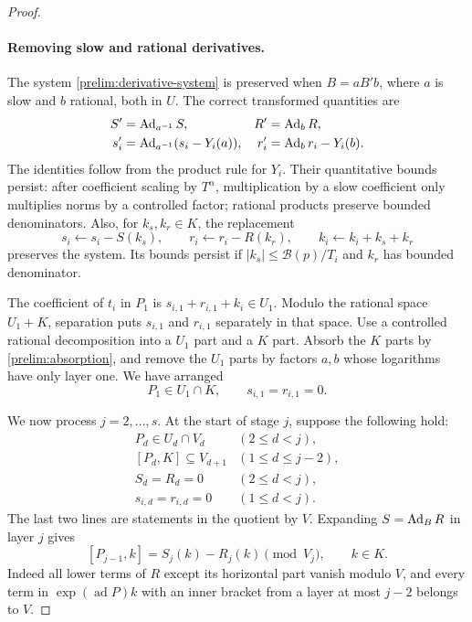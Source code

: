 \begin{proof}
\paragraph{Removing slow and rational derivatives.}
The system \eqref{prelim:derivative-system} is preserved when
$B=aB'b$, where $a$ is slow and $b$ rational, both in $U$.
The correct transformed quantities are
\begin{equation}\label{prelim:transformation}
 \begin{aligned}
 S'&=\operatorname{Ad}_{a^{-1}}S,& R'&=\operatorname{Ad}_b R,\\
 s'_i&=\operatorname{Ad}_{a^{-1}}(s_i-Y_i(a)),&
 r'_i&=\operatorname{Ad}_b r_i-Y_i(b).
 \end{aligned}
\end{equation}
The identities follow from the product rule for $Y_i$.
Their quantitative bounds persist: after coefficient scaling by
$T^\alpha$, multiplication by a slow coefficient only multiplies
norms by a controlled factor; rational products preserve bounded
denominators.  Also, for $k_s,k_r\in K$, the replacement
\begin{equation}\label{prelim:absorption}
 s_i\leftarrow s_i-S(k_s),\qquad
 r_i\leftarrow r_i-R(k_r),\qquad
 k_i\leftarrow k_i+k_s+k_r
\end{equation}
preserves the system.  Its bounds persist if
$|k_s|\leq\mathcal B(p)/T_i$ and $k_r$ has bounded denominator.

The coefficient of $t_i$ in $P_1$ is
$s_{i,1}+r_{i,1}+k_i\in U_1$.
Modulo the rational space $U_1+K$, separation puts $s_{i,1}$
and $r_{i,1}$ separately in that space.  Use a controlled rational
decomposition into a $U_1$ part and a $K$ part.  Absorb the
$K$ parts by \eqref{prelim:absorption}, and remove the $U_1$
parts by factors $a,b$ whose logarithms have only layer one.
We have arranged
\begin{equation}\label{prelim:horizontal-normalization}
 P_1\in U_1\cap K,\qquad s_{i,1}=r_{i,1}=0.
\end{equation}

We now process $j=2,\ldots,s$.  At the start of stage $j$,
suppose the following hold:
\[
 \begin{array}{ll}
 P_d\in U_d\cap V_d &(2\leq d<j),\\
 {}[P_d,K]\subseteq V_{d+1}&(1\leq d\leq j-2),\\
 S_d=R_d=0 &(2\leq d<j),\\
 s_{i,d}=r_{i,d}=0 &(1\leq d<j).
 \end{array}
\]
The last two lines are statements in the quotient by $V$.
Expanding $S=\operatorname{Ad}_B R$ in layer $j$ gives
\begin{equation}\label{prelim:bracket-system}
 [P_{j-1},k]=S_j(k)-R_j(k)\pmod {V_j},
 \qquad k\in K.
\end{equation}
Indeed all lower terms of $R$ except its horizontal part vanish
modulo $V$, and every term in $\exp(\operatorname{ad}P)k$
with an inner bracket from a layer at most $j-2$ belongs to $V$.


\end{proof}
